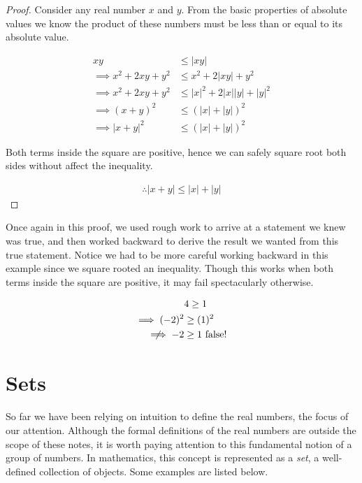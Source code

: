 \documentclass{report}
\begin{document}
\begin{proof}
	Consider any real number $x$ and $y$. From the basic properties of absolute values we know the product of these numbers must be less than or equal to its absolute value.
	
	\begin{align*}
		xy &\le |xy| \\
		\implies x^2 + 2xy + y^2 &\le x^2 + 2|xy| + y^2 \\
		\implies x^2 + 2xy + y^2 &\le |x|^2 + 2|x||y| + |y|^2 \\
		\implies (x + y)^2 &\le (|x| + |y|)^2 \\
		\implies |x + y|^2 &\le (|x| + |y|)^2
	\end{align*}
	
	Both terms inside the square are positive, hence we can safely square root both sides without affect the inequality.
	
	\begin{align*}
		\therefore |x + y| \le |x| + |y|
	\end{align*}
\end{proof}
\vspace{\baselineskip}

Once again in this proof, we used rough work to arrive at a statement we knew was true, and then worked backward to derive the result we wanted from this true statement. Notice we had to be more careful working backward in this example since we square rooted an inequality. Though this works when both terms inside the square are positive, it may fail spectacularly otherwise.

\begin{align*}
	&4 \ge 1 \\
	\implies (-2)^2 &\ge (1)^2 \\
	\centernot\implies -2 &\ge 1 \text{ false!}
\end{align*}

\section{Sets}
So far we have been relying on intuition to define the real numbers, the focus of our attention. Although the formal definitions of the real numbers are outside the scope of these notes, it is worth paying attention to this fundamental notion of a group of numbers. In mathematics, this concept is represented as a \emph{set},  a well-defined collection of objects. Some examples are listed below.
\end{document}
